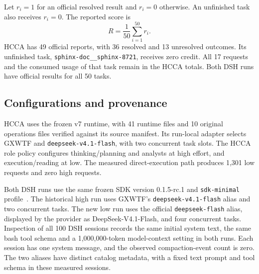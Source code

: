 \documentclass[10pt,a4paper]{article}
\begin{document}
Let $r_i=1$ for an official resolved result and $r_i=0$ otherwise. An unfinished
task also receives $r_i=0$. The reported score is
\begin{equation}
  R = \frac{1}{50}\sum_{i=1}^{50} r_i.
\end{equation}
HCCA has 49 official reports, with 36 resolved and 13 unresolved outcomes.
Its unfinished task, \texttt{sphinx-doc\_\_sphinx-8721}, receives zero credit.
All 17 requests and the consumed usage of that task remain in the HCCA totals.
Both DSH runs have official results for all 50 tasks.

\subsection{Configurations and provenance}

HCCA uses the frozen v7 runtime, with 41 runtime files and 10 original
operations files verified against its source manifest. Its run-local adapter
selects GXWTF and \texttt{deepseek-v4.1-flash}, with two concurrent task slots.
The HCCA role policy configures thinking/planning and analysts at high effort,
and execution/reading at low. The measured direct-execution path produces
1,301 low requests and zero high requests.

Both DSH runs use the same frozen SDK version 0.1.5-rc.1 and
\texttt{sdk-minimal} profile~\cite{dsh}. The historical high run uses GXWTF's
\texttt{deepseek-v4.1-flash} alias and two concurrent tasks. The new low run
uses the official \texttt{deepseek-flash} alias, displayed by the provider as
DeepSeek-V4.1-Flash, and four concurrent tasks. Inspection of all 100 DSH
sessions records the same initial system text, the same bash tool schema and
a 1,000,000-token model-context setting in both runs. Each session has one
system message, and the observed compaction-event count is zero. The two
aliases have distinct catalog metadata, with a fixed text prompt and tool
schema in these measured sessions.
\end{document}
